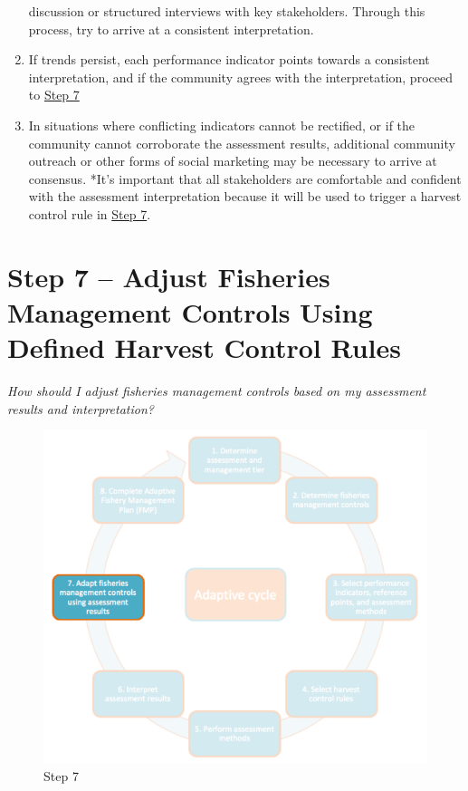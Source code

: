 \documentclass[]{book}
\begin{document}
\begin{enumerate}
  discussion or structured interviews with key stakeholders. Through
  this process, try to arrive at a consistent interpretation.
\item
  If trends persist, each performance indicator points towards a
  consistent interpretation, and if the community agrees with the
  interpretation, proceed to \protect\hyperlink{Step7}{Step 7}
\item
  In situations where conflicting indicators cannot be rectified, or if
  the community cannot corroborate the assessment results, additional
  community outreach or other forms of social marketing may be necessary
  to arrive at consensus. *It's important that all stakeholders are
  comfortable and confident with the assessment interpretation because
  it will be used to trigger a harvest control rule in
  \protect\hyperlink{Step7}{Step 7}.
\end{enumerate}

\hypertarget{Step7}{\chapter{Step 7 -- Adjust Fisheries Management
Controls Using Defined Harvest Control Rules}\label{Step7}}

\emph{How should I adjust fisheries management controls based on my
assessment results and interpretation?}

\begin{figure}
\centering
\includegraphics{myMediaFolder/media/Step7.png}
\caption{\label{fig:Step7}Step 7}
\end{figure}
\end{document}
